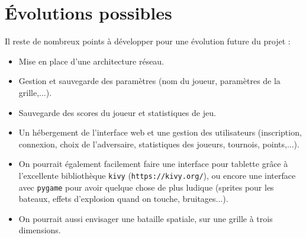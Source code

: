\section{Évolutions possibles}
Il reste de nombreux points à développer pour une évolution future du projet :
\begin{itemize}
\item Mise en place d'une architecture réseau.
\item Gestion et sauvegarde des paramètres (nom du joueur, paramètres de la grille,...).
\item Sauvegarde des scores du joueur et statistiques de jeu.
\item Un hébergement de l'interface web et une gestion des utilisateurs (inscription, connexion, choix de l'adversaire, statistiques des joueurs, tournois, points,...).
\item On pourrait également facilement faire une interface pour tablette grâce à l'excellente bibliothèque \texttt{kivy} (\texttt{https://kivy.org/}), ou encore une interface avec \texttt{pygame} pour avoir quelque chose de plus ludique (sprites pour les bateaux, effets d'explosion quand on touche, bruitages...).
\item On pourrait aussi envisager une bataille spatiale, sur une grille à trois dimensions.
\end{itemize}





%
%
